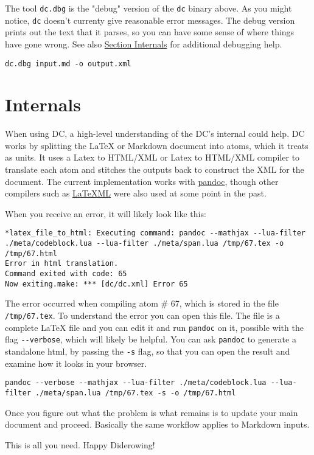 \begin{gram} 
The tool \lstinline`dc.dbg` is the "debug" version of the \lstinline`dc` binary above. As you might notice, \lstinline`dc` doesn't currenty give reasonable error messages.  The debug version prints out the text that it parses, so you can have some sense of where things have gone wrong. 
See also \href{sec:dc::internals}{Section Internals} for additional debugging help.
\begin{lstlisting}
dc.dbg input.md -o output.xml
\end{lstlisting}
\end{gram}

\section{Internals}
\label{sec:dc::internals}

When using DC, a high-level understanding of the DC's internal could help.
%
DC works by splitting the LaTeX or Markdown document into atoms, which it treats as units.
%
It uses a Latex to HTML/XML or Latex to HTML/XML compiler to translate each atom and stitches the outputs back to construct the XML for the document.
%
The current implementation works with \href{www.pandoc.org}{pandoc}, though other compilers such as \href{https://dlmf.nist.gov/LaTeXML/}{LaTeXML} were also used at some point in the past.

When you receive an error, it will likely look like this:
\begin{lstlisting}
*latex_file_to_html: Executing command: pandoc --mathjax --lua-filter ./meta/codeblock.lua --lua-filter ./meta/span.lua /tmp/67.tex -o /tmp/67.html
Error in html translation.
Command exited with code: 65
Now exiting.make: *** [dc/dc.xml] Error 65
\end{lstlisting} 
% 
The error occurred when compiling atom \# 67, which is stored in the file \lstinline`/tmp/67.tex`.
%
To understand the error you can open this file.  The file is a complete LaTeX file and you can edit it and run \lstinline`pandoc` on it, possible with the flag \lstinline`--verbose`, which will likely be helpful.
%
You can ask \lstinline`pandoc` to generate a standalone html, by passing the \lstinline`-s` flag, so that you can open the result and examine how it looks in your browser.
%
\begin{lstlisting}
pandoc --verbose --mathjax --lua-filter ./meta/codeblock.lua --lua-filter ./meta/span.lua /tmp/67.tex -s -o /tmp/67.html
\end{lstlisting}
%
Once you figure out what the problem is what remains is to update your main document and proceed.
%
Basically the same workflow applies to Markdown inputs.

This is all you need. Happy Diderowing!

